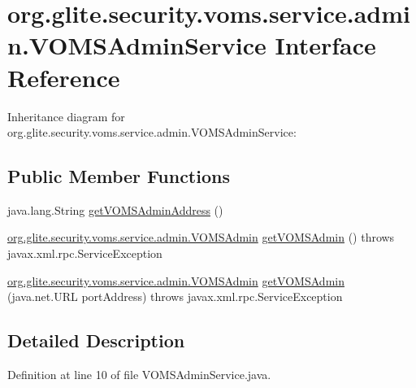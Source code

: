 \hypertarget{interfaceorg_1_1glite_1_1security_1_1voms_1_1service_1_1admin_1_1VOMSAdminService}{
\section{org.glite.security.voms.service.admin.VOMSAdminService Interface Reference}
\label{interfaceorg_1_1glite_1_1security_1_1voms_1_1service_1_1admin_1_1VOMSAdminService}
}


Inheritance diagram for org.glite.security.voms.service.admin.VOMSAdminService:
\subsection*{Public Member Functions}
\begin{DoxyCompactItemize}
\item 
java.lang.String \hyperlink{interfaceorg_1_1glite_1_1security_1_1voms_1_1service_1_1admin_1_1VOMSAdminService_aa6954ab207748588e65b1d3acb342cbe}{getVOMSAdminAddress} ()
\item 
\hyperlink{interfaceorg_1_1glite_1_1security_1_1voms_1_1service_1_1admin_1_1VOMSAdmin}{org.glite.security.voms.service.admin.VOMSAdmin} \hyperlink{interfaceorg_1_1glite_1_1security_1_1voms_1_1service_1_1admin_1_1VOMSAdminService_a3a21cfa1a638a583606607085ae65092}{getVOMSAdmin} ()  throws javax.xml.rpc.ServiceException
\item 
\hyperlink{interfaceorg_1_1glite_1_1security_1_1voms_1_1service_1_1admin_1_1VOMSAdmin}{org.glite.security.voms.service.admin.VOMSAdmin} \hyperlink{interfaceorg_1_1glite_1_1security_1_1voms_1_1service_1_1admin_1_1VOMSAdminService_a1c71525ec982f1d3928310edc1b46405}{getVOMSAdmin} (java.net.URL portAddress)  throws javax.xml.rpc.ServiceException
\end{DoxyCompactItemize}


\subsection{Detailed Description}


Definition at line 10 of file VOMSAdminService.java.



